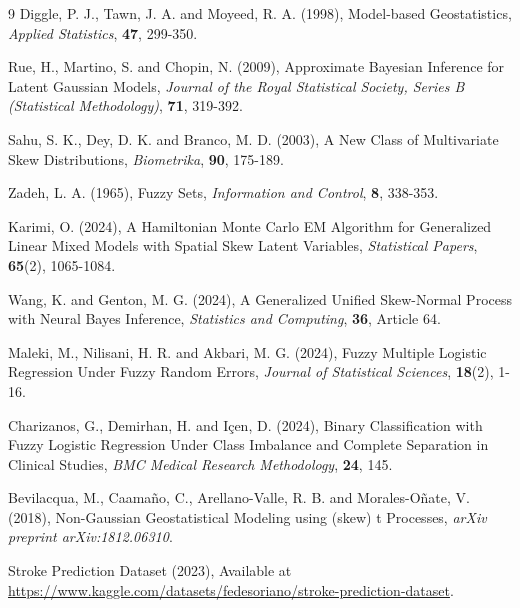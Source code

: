 \documentclass[twoside]{article}
\begin{document}
\begin{thebibliography}{9}
Diggle, P. J., Tawn, J. A. and Moyeed, R. A. (1998), Model-based Geostatistics, {\it Applied Statistics}, {\bf 47}, 299-350.

Rue, H., Martino, S. and Chopin, N. (2009), Approximate Bayesian Inference for Latent Gaussian Models, {\it Journal of the Royal Statistical Society, Series B (Statistical Methodology)}, {\bf 71}, 319-392.

 Sahu, S. K., Dey, D. K. and  Branco, M. D. (2003), A New Class of Multivariate Skew Distributions, {\it Biometrika}, {\bf 90}, 175-189.

Zadeh, L. A. (1965), Fuzzy Sets, {\it Information and Control}, {\bf 8}, 338-353.

Karimi, O. (2024), A Hamiltonian Monte Carlo EM Algorithm for Generalized Linear Mixed Models with Spatial Skew Latent Variables, {\it Statistical Papers}, {\bf 65}(2), 1065-1084.

Wang, K. and Genton, M. G. (2024), A Generalized Unified Skew-Normal Process with Neural Bayes Inference, {\it Statistics and Computing}, {\bf 36}, Article 64.

Maleki, M., Nilisani, H. R. and Akbari, M. G. (2024), Fuzzy Multiple Logistic Regression Under Fuzzy Random Errors, {\it Journal of Statistical Sciences}, {\bf 18}(2), 1-16.

Charizanos, G., Demirhan, H. and Içen, D. (2024), Binary Classification with Fuzzy Logistic Regression Under Class Imbalance and Complete Separation in Clinical Studies, {\it BMC Medical Research Methodology}, {\bf 24}, 145.

Bevilacqua, M., Caamaño, C., Arellano-Valle, R. B. and Morales-Oñate, V. (2018), Non-Gaussian Geostatistical Modeling using (skew) t Processes, {\it arXiv preprint arXiv:1812.06310}.

Stroke Prediction Dataset (2023),  Available at \url{https://www.kaggle.com/datasets/fedesoriano/stroke-prediction-dataset}.

\end{thebibliography}
\end{document}
